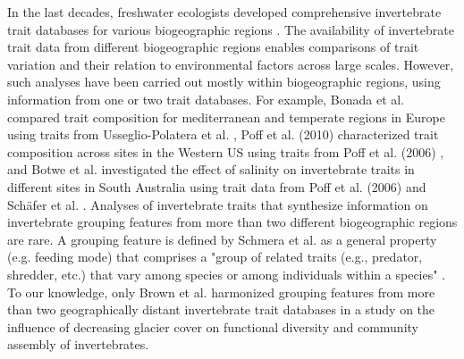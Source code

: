 \documentclass{article}
\begin{document}
In the last decades, freshwater ecologists developed comprehensive invertebrate trait databases for various biogeographic regions \cite{usseglio-polatera_biomonitoring_2000, schmidt-kloiber_www.freshwaterecology.info_2015, vieira_database_nodate, Philips_and_Smith_NZ_DB_2018, kefford_integrated_2020, tomanova_trophic_2006}. The availability of invertebrate trait data from different biogeographic regions enables comparisons of trait variation and their relation to environmental factors across large scales. However, such analyses have been carried out mostly within biogeographic regions, using information from one or two trait databases. For example, Bonada et al. \cite{bonada_taxonomic_2007} compared trait composition for mediterranean and temperate regions in Europe using traits from Usseglio-Polatera et al. \cite{usseglio-polatera_biomonitoring_2000}, Poff et al. (2010) \cite{poff_developing_2010} characterized trait composition across sites in the Western US using traits from Poff et al. (2006) \cite{poff_functional_2006}, and Botwe et al. \cite{botwe_effects_2018} investigated the effect of salinity on invertebrate traits in different sites in South Australia using trait data from Poff et al. (2006) \cite{poff_functional_2006} and Schäfer et al. \cite{schafer_trait_2011}. 
Analyses of invertebrate traits that synthesize information on invertebrate grouping features from more than two different biogeographic regions are rare. A grouping feature is defined by Schmera et al. as a general property (e.g. feeding mode) that comprises a "group of related traits (e.g., predator, shredder, etc.) that vary among species or among individuals within a species" \cite{schmera_proposed_2015}. To our knowledge, only Brown et al. \cite{brown_functional_2018} harmonized grouping features from more than two geographically distant invertebrate trait databases in a study on the influence of decreasing glacier cover on functional diversity and community assembly of invertebrates. 
\end{document}
